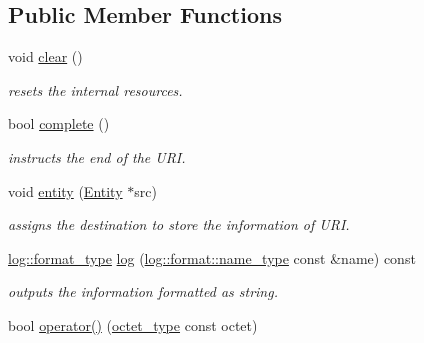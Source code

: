 \subsection*{Public Member Functions}
\begin{DoxyCompactItemize}
\item 
\hypertarget{classhryky_1_1uri_1_1_reader_ad78103b3b44a0bda56ed1f5db38257be}{void \hyperlink{classhryky_1_1uri_1_1_reader_ad78103b3b44a0bda56ed1f5db38257be}{clear} ()}\label{classhryky_1_1uri_1_1_reader_ad78103b3b44a0bda56ed1f5db38257be}

\begin{DoxyCompactList}\small\item\em resets the internal resources. \end{DoxyCompactList}\item 
\hypertarget{classhryky_1_1uri_1_1_reader_a4f3d5e7bda68ec83d08e9879576063a1}{bool \hyperlink{classhryky_1_1uri_1_1_reader_a4f3d5e7bda68ec83d08e9879576063a1}{complete} ()}\label{classhryky_1_1uri_1_1_reader_a4f3d5e7bda68ec83d08e9879576063a1}

\begin{DoxyCompactList}\small\item\em instructs the end of the U\-R\-I. \end{DoxyCompactList}\item 
\hypertarget{classhryky_1_1uri_1_1_reader_a3debb393401ce8f6c045200d0cc85382}{void \hyperlink{classhryky_1_1uri_1_1_reader_a3debb393401ce8f6c045200d0cc85382}{entity} (\hyperlink{classhryky_1_1uri_1_1_entity}{Entity} $\ast$src)}\label{classhryky_1_1uri_1_1_reader_a3debb393401ce8f6c045200d0cc85382}

\begin{DoxyCompactList}\small\item\em assigns the destination to store the information of U\-R\-I. \end{DoxyCompactList}\item 
\hypertarget{classhryky_1_1uri_1_1_reader_a3a1524cf388674171fe5e9b74b03c768}{\hyperlink{namespacehryky_1_1log_ad50448c3f934f1eacd5c1bcffe8111e1}{log\-::format\-\_\-type} \hyperlink{classhryky_1_1uri_1_1_reader_a3a1524cf388674171fe5e9b74b03c768}{log} (\hyperlink{namespacehryky_1_1log_1_1format_ab7408d1e2ed2d648dbf9bba69eb74288}{log\-::format\-::name\-\_\-type} const \&name) const }\label{classhryky_1_1uri_1_1_reader_a3a1524cf388674171fe5e9b74b03c768}

\begin{DoxyCompactList}\small\item\em outputs the information formatted as string. \end{DoxyCompactList}\item 
\hypertarget{classhryky_1_1uri_1_1_reader_aef75ea422f5f8c4912ed7359d29c5c31}{bool \hyperlink{classhryky_1_1uri_1_1_reader_aef75ea422f5f8c4912ed7359d29c5c31}{operator()} (\hyperlink{namespacehryky_a488cba8b666be33ccca70e819684e3c8}{octet\-\_\-type} const octet)}\label{classhryky_1_1uri_1_1_reader_aef75ea422f5f8c4912ed7359d29c5c31}


\end{DoxyCompactItemize}
